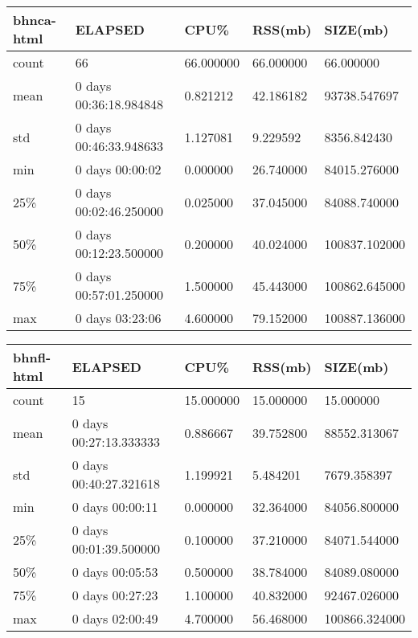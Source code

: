 \documentclass{article}
\begin{document}
\begin{table}[H]
\begin{tabular}{|l|l|l|l|l|}
\hline bhnca-html & ELAPSED & CPU\% & RSS(mb) & SIZE(mb) \\
\hline count & 66 & 66.000000 & 66.000000 & 66.000000 \\
\hline mean & 0 days 00:36:18.984848 & 0.821212 & 42.186182 & 93738.547697 \\
\hline std & 0 days 00:46:33.948633 & 1.127081 & 9.229592 & 8356.842430 \\
\hline min & 0 days 00:00:02 & 0.000000 & 26.740000 & 84015.276000 \\
\hline 25\% & 0 days 00:02:46.250000 & 0.025000 & 37.045000 & 84088.740000 \\
\hline 50\% & 0 days 00:12:23.500000 & 0.200000 & 40.024000 & 100837.102000 \\
\hline 75\% & 0 days 00:57:01.250000 & 1.500000 & 45.443000 & 100862.645000 \\
\hline max & 0 days 03:23:06 & 4.600000 & 79.152000 & 100887.136000 \\
\hline
\end{tabular}
\label{TABLE-SessionSize-bhnca-html}
\end{table}
\begin{table}[H]
\begin{tabular}{|l|l|l|l|l|}
\hline bhnfl-html & ELAPSED & CPU\% & RSS(mb) & SIZE(mb) \\
\hline count & 15 & 15.000000 & 15.000000 & 15.000000 \\
\hline mean & 0 days 00:27:13.333333 & 0.886667 & 39.752800 & 88552.313067 \\
\hline std & 0 days 00:40:27.321618 & 1.199921 & 5.484201 & 7679.358397 \\
\hline min & 0 days 00:00:11 & 0.000000 & 32.364000 & 84056.800000 \\
\hline 25\% & 0 days 00:01:39.500000 & 0.100000 & 37.210000 & 84071.544000 \\
\hline 50\% & 0 days 00:05:53 & 0.500000 & 38.784000 & 84089.080000 \\
\hline 75\% & 0 days 00:27:23 & 1.100000 & 40.832000 & 92467.026000 \\
\hline max & 0 days 02:00:49 & 4.700000 & 56.468000 & 100866.324000 \\
\hline
\end{tabular}
\label{TABLE-SessionSize-bhnfl-html}
\end{table}
\end{document}

